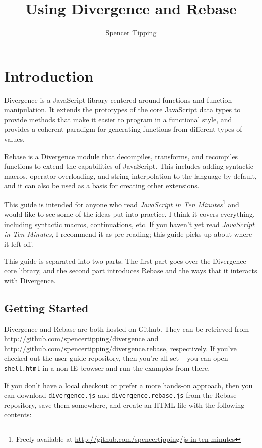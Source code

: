 \documentclass{report}
\title{Using Divergence and Rebase}
\author{Spencer Tipping}
\begin{document}
\maketitle\tableofcontents

\chapter* {Introduction}
   Divergence is a JavaScript library centered around functions and function manipulation. It extends the prototypes of the core JavaScript data types to provide methods that make it easier to
   program in a functional style, and provides a coherent paradigm for generating functions from different types of values.

   Rebase is a Divergence module that decompiles, transforms, and recompiles functions to extend the capabilities of JavaScript. This includes adding syntactic macros, operator overloading, and
   string interpolation to the language by default, and it can also be used as a basis for creating other extensions.

   This guide is intended for anyone who read {\em JavaScript in Ten Minutes}\footnote{Freely available at \url{http://github.com/spencertipping/js-in-ten-minutes}} and would like to see some
   of the ideas put into practice. I think it covers everything, including syntactic macros, continuations, etc. If you haven't yet read {\em JavaScript in Ten Minutes}, I recommend it as
   pre-reading; this guide picks up about where it left off.

   This guide is separated into two parts. The first part goes over the Divergence core library, and the second part introduces Rebase and the ways that it interacts with Divergence.

\section* {Getting Started}
     Divergence and Rebase are both hosted on Github. They can be retrieved from \url{http://github.com/spencertipping/divergence} and \url{http://github.com/spencertipping/divergence.rebase},
     respectively. If you've checked out the user guide repository, then you're all set -- you can open \verb|shell.html| in a non-IE browser and run the examples from there.
    
     If you don't have a local checkout or prefer a more hands-on approach, then you can download \verb|divergence.js| and \verb|divergence.rebase.js| from the Rebase repository, save them
     somewhere, and create an HTML file with the following contents:
\end{document}
